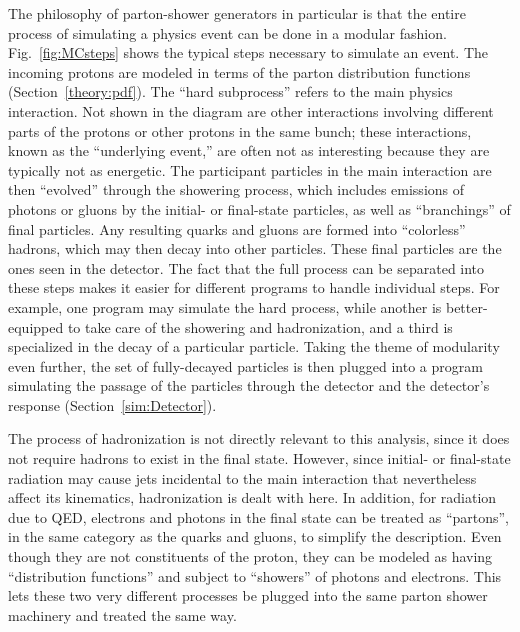 The philosophy of parton-shower generators 
in particular 
is that the entire process of simulating 
a physics event can be done in a modular fashion.  
Fig.~\ref{fig:MCsteps} 
shows the typical steps necessary to simulate an event.  
The incoming protons are modeled in terms of the 
parton distribution functions (Section~\ref{theory:pdf}).  
The ``hard subprocess'' refers to the main 
physics interaction.  
Not shown in the diagram are other interactions 
involving different parts of the protons 
or other protons in the same bunch; 
these interactions, known as the ``underlying event,''  
are often not as interesting 
because they are typically not as energetic.  
The participant particles in the main interaction 
are then ``evolved'' through the showering process, 
which includes emissions of photons or gluons 
by the initial- or final-state particles, 
as well as ``branchings'' of final particles. %
Any resulting quarks and gluons are 
formed into ``colorless'' hadrons, %
which may then decay into other particles. 
These final particles are the ones seen 
in the detector.  
The fact that the full process can be separated 
into these steps 
makes it easier for different programs 
to handle individual steps.  
For example, one program may simulate the 
hard process, 
while another is better-equipped to take care 
of the showering and hadronization, 
and a third is specialized in the decay of 
a particular particle.  
Taking the theme of modularity even further, 
the set of fully-decayed particles 
is then plugged into a program simulating 
the passage of the particles through the detector 
and the detector's response (Section~\ref{sim:Detector}).  

The process of hadronization is not directly 
relevant to this analysis, 
since it does not require hadrons to 
exist in the final state.  
However, since initial- or final-state radiation 
may cause jets incidental to the main interaction 
that nevertheless affect its kinematics, 
hadronization is dealt with here.  
In addition, 
for radiation due to QED, 
electrons and photons in the final state 
can be treated as ``partons'', 
in the same category as the quarks and gluons, 
to simplify the description.  
Even though they are not constituents of the proton, 
they can be modeled as having 
``distribution functions'' 
and subject to ``showers'' of 
photons and electrons. 
This lets these two very different processes be 
plugged into the same parton shower machinery 
and treated the same way.  

